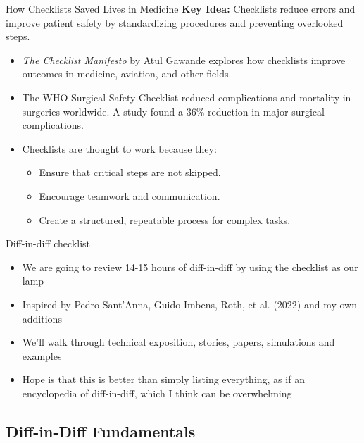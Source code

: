 \documentclass{beamer}
\begin{document}
\begin{frame}{How Checklists Saved Lives in Medicine}
    \textbf{Key Idea:} Checklists reduce errors and improve patient safety by standardizing procedures and preventing overlooked steps.

    \begin{itemize}
        \item 
	\textit{The Checklist Manifesto} by Atul Gawande explores how checklists improve outcomes in medicine, aviation, and other fields.
        \item 
	The WHO Surgical Safety Checklist reduced complications and mortality in surgeries worldwide. A study found a 36\% reduction in major surgical complications.
        \item 
	Checklists are thought to work because they:
        \begin{itemize}
            \item Ensure that critical steps are not skipped.
            \item Encourage teamwork and communication.
            \item Create a structured, repeatable process for complex tasks.
        \end{itemize}
    \end{itemize}


\end{frame}

\begin{frame}{Diff-in-diff checklist}

\begin{itemize}
       \item We are going to review 14-15 hours of diff-in-diff by using the checklist as our lamp 
       \item Inspired by Pedro Sant'Anna, Guido Imbens, Roth, et al. (2022) and my own additions
	\item We'll walk through technical exposition, stories, papers, simulations and examples
	\item Hope is that this is better than simply listing everything, as if an encyclopedia of diff-in-diff, which I think can be overwhelming
\end{itemize}

\end{frame}


\subsection{Diff-in-Diff Fundamentals}
\end{document}
